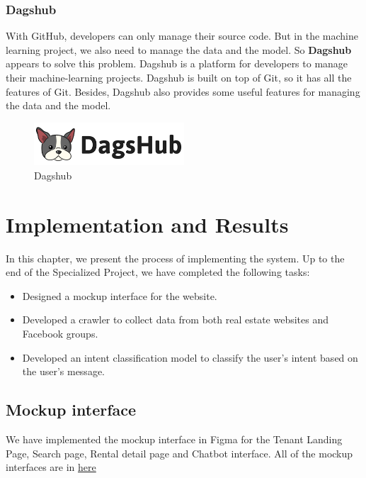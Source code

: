 \subsubsection{Dagshub}
With GitHub, developers can only manage their source code. But in the machine learning project, we also need to manage the data and the model. So \textbf{Dagshub} appears to solve this problem.
Dagshub is a platform for developers to manage their machine-learning projects. Dagshub is built on top of Git, so it has all the features of Git. Besides, Dagshub also provides some useful features for managing the data and the model.

\begin{figure}[ht]
    \centering
    \includegraphics[width=0.5\textwidth]{../Images/8.Technology_Stack/dagshub_logo.png}
    \caption{Dagshub}
    \label{fig:dagshub}
\end{figure}

\section{Implementation and Results}
In this chapter, we present the process of implementing the system. Up to the end of the Specialized Project, we have completed the following tasks:
\begin{itemize}
    \item Designed a mockup interface for the website.
    \item Developed a crawler to collect data from both real estate websites and Facebook groups.
    \item Developed an intent classification model to classify the user's intent based on the user's message.
\end{itemize}

\subsection{Mockup interface}
We have implemented the mockup interface in Figma for the Tenant Landing Page, Search page, Rental detail page and Chatbot interface. All of the mockup interfaces are in \href{https://www.figma.com/proto/4W6eMgIgZQaSfi5h8Mn8Af/Material-UI-for-Figma-(and-MUI-X)-(Community)-(Copy)?page-id=4230%3A722&type=design&node-id=6609-8548&viewport=4481%2C1065%2C1&t=QoVk3s8CM7w3qcvh-1&scaling=scale-down-width&starting-point-node-id=6759%3A76810}{here}

